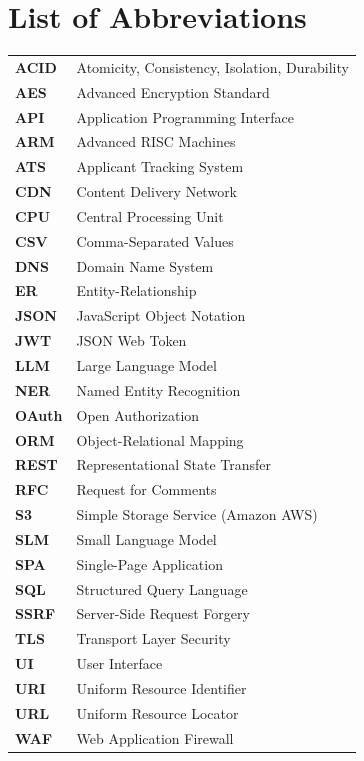 \documentclass[12pt,a4paper,oneside]{report}
\begin{document}


\tableofcontents
\newpage
\listoffigures
\newpage
\listoftables
\newpage

\chapter*{List of Abbreviations}
\begin{tabular}{ll}
\textbf{ACID} & Atomicity, Consistency, Isolation, Durability \\
\textbf{AES} & Advanced Encryption Standard \\
\textbf{API} & Application Programming Interface \\
\textbf{ARM} & Advanced RISC Machines \\
\textbf{ATS} & Applicant Tracking System \\
\textbf{CDN} & Content Delivery Network \\
\textbf{CPU} & Central Processing Unit \\
\textbf{CSV} & Comma-Separated Values \\
\textbf{DNS} & Domain Name System \\
\textbf{ER} & Entity-Relationship \\
\textbf{JSON} & JavaScript Object Notation \\
\textbf{JWT} & JSON Web Token \\
\textbf{LLM} & Large Language Model \\
\textbf{NER} & Named Entity Recognition \\
\textbf{OAuth} & Open Authorization \\
\textbf{ORM} & Object-Relational Mapping \\
\textbf{REST} & Representational State Transfer \\
\textbf{RFC} & Request for Comments \\
\textbf{S3} & Simple Storage Service (Amazon AWS) \\
\textbf{SLM} & Small Language Model \\
\textbf{SPA} & Single-Page Application \\
\textbf{SQL} & Structured Query Language \\
\textbf{SSRF} & Server-Side Request Forgery \\
\textbf{TLS} & Transport Layer Security \\
\textbf{UI} & User Interface \\
\textbf{URI} & Uniform Resource Identifier \\
\textbf{URL} & Uniform Resource Locator \\
\textbf{WAF} & Web Application Firewall
\end{tabular}
\end{document}
